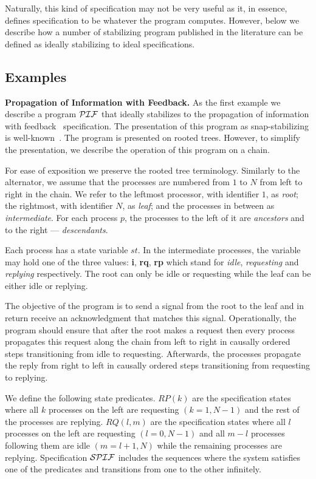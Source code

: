 \documentclass[11pt]{llncs}
\def\PROG#1{${\cal #1}$}
\begin{document}
Naturally, this kind of specification may not be very useful as it,
in essence, defines specification to be whatever the program
computes. However, below we describe how a number of stabilizing
program published in the literature can be defined as ideally
stabilizing to ideal specifications.

\subsection{Examples}

\textbf{Propagation of Information with Feedback.} As the first
example we describe a program \PROG{PIF} that ideally stabilizes to
the propagation of information with feedback~\cite{C82,S83}
specification. The presentation of this program as snap-stabilizing is
well-known~\cite{BDPV99c}. The program is presented on rooted
trees. However, to simplify the presentation, we describe the
operation of this program on a chain.

For ease of exposition we preserve the rooted tree terminology.
Similarly to the alternator, we assume that the processes are numbered
from $1$ to $N$ from left to right in the chain. We refer to the
leftmost processor, with identifier $1$, as \emph{root}; the
rightmost, with identifier $N$, as \emph{leaf}; and the processes in
between as \emph{intermediate}. For each process $p$, the processes to
the left of it are \emph{ancestors} and to the right ---
\emph{descendants}.

Each process has a state variable $st$.  In the intermediate
processes, the variable may hold one of the three values: \textbf{i},
\textbf{rq}, \textbf{rp} which stand for \emph{idle},
\emph{requesting} and \emph{replying} respectively. The root can only
be idle or requesting while the leaf can be either idle or replying.

The objective of the program is to send a signal from the root to the
leaf and in return receive an acknowledgment that matches this
signal. Operationally, the program should ensure that after the root
makes a request then every process propagates this request along the
chain from left to right in causally ordered steps transitioning from
idle to requesting. Afterwards, the processes propagate the reply from
right to left in causally ordered steps transitioning from requesting
to replying.

We define the following state predicates. $RP(k)$ are the
specification states where all $k$ processes on the left are
requesting $(k=1,N-1)$ and the rest of the processes are
replying. $RQ(l,m)$ are the specification states where all $l$
processes on the left are requesting $(l=0,N-1)$ and all $m-l$
processes following them are idle $(m = l+1, N)$ while the remaining
processes are replying. Specification \PROG{SPIF} includes the
sequences where the system satisfies one of the predicates and
transitions from one to the other infinitely.
\end{document}
